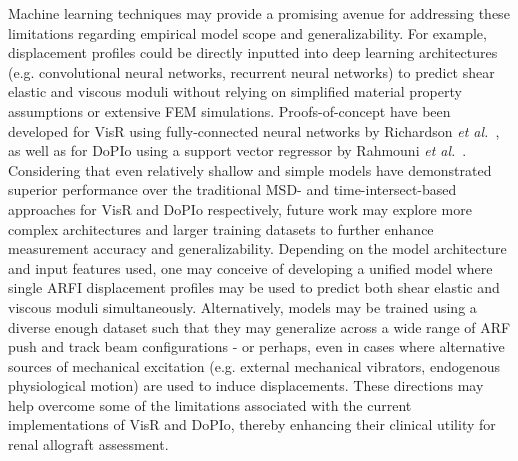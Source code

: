 Machine learning techniques may provide a promising avenue for addressing these limitations regarding empirical model scope and generalizability. For example, displacement profiles could be directly inputted into deep learning architectures (e.g. convolutional neural networks, recurrent neural networks) to predict shear elastic and viscous moduli without relying on simplified material property assumptions or extensive FEM simulations. Proofs-of-concept have been developed for VisR using fully-connected neural networks by Richardson \emph{et al.}~\cite{richardson_Quantitative_2024}, as well as for DoPIo using a support vector regressor by Rahmouni \emph{et al.}~\cite{rahmouni_Machine_2020}. Considering that even relatively shallow and simple models have demonstrated superior performance over the traditional MSD- and time-intersect-based approaches for VisR and DoPIo respectively, future work may explore more complex architectures and larger training datasets to further enhance measurement accuracy and generalizability. Depending on the model architecture and input features used, one may conceive of developing a unified model where single ARFI displacement profiles may be used to predict both shear elastic and viscous moduli simultaneously. Alternatively, models may be trained using a diverse enough dataset such that they may generalize across a wide range of ARF push and track beam configurations - or perhaps, even in cases where alternative sources of mechanical excitation (e.g. external mechanical vibrators, endogenous physiological motion) are used to induce displacements. These directions may help overcome some of the limitations associated with the current implementations of VisR and DoPIo, thereby enhancing their clinical utility for renal allograft assessment.
